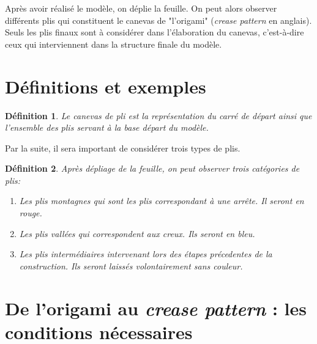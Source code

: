 \documentclass[a4paper,12pt,french]{report}
\newtheorem{definition}{Définition}[section]
\begin{document}
Après avoir réalisé le modèle, on déplie la feuille. On peut alors 
observer différents plis qui constituent le canevas de 
"l'origami" (\emph{crease pattern} en anglais). Seuls les plis finaux 
sont à considérer dans l'élaboration du 
canevas, c'est-à-dire ceux qui interviennent dans la structure finale 
du modèle. 


	\section{Définitions et exemples}
 
    \begin{definition} 
      
      Le canevas de pli est la représentation du carré de départ ainsi que l'ensemble des plis 
      servant à la base départ du modèle.
      
    \end{definition}
    
    Par la suite, il sera important de considérer trois types de plis.
    
      \begin{definition}
      
        Après dépliage de la feuille, on peut observer trois 
        catégories de plis:
        
        \begin{enumerate}
        
          \item Les plis \emph{montagnes} qui sont les plis correspondant à 
          une arrête. Il seront en rouge.
          \item Les plis \emph{vallées} qui correspondent aux creux. Ils 
          seront en bleu.
          \item Les plis intermédiaires intervenant lors des étapes 
          précedentes de la construction. Ils seront laissés 
          volontairement sans couleur.
        
        \end{enumerate}
      
      \end{definition}
    
    
    

		\section{De l'origami au \emph{crease pattern} : les conditions 
		nécessaires}  
\end{document}

